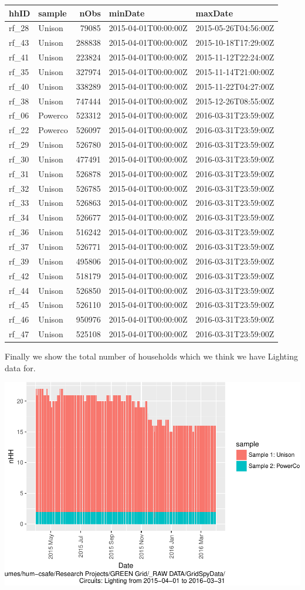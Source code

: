 \documentclass[]{article}
\begin{document}
\begin{longtable}[]{@{}llrll@{}}
\toprule
hhID & sample & nObs & minDate & maxDate\tabularnewline
\midrule
\endhead
rf\_28 & Unison & 79085 & 2015-04-01T00:00:00Z &
2015-05-26T04:56:00Z\tabularnewline
rf\_43 & Unison & 288838 & 2015-04-01T00:00:00Z &
2015-10-18T17:29:00Z\tabularnewline
rf\_41 & Unison & 223824 & 2015-04-01T00:00:00Z &
2015-11-12T22:24:00Z\tabularnewline
rf\_35 & Unison & 327974 & 2015-04-01T00:00:00Z &
2015-11-14T21:00:00Z\tabularnewline
rf\_40 & Unison & 338289 & 2015-04-01T00:00:00Z &
2015-11-22T04:27:00Z\tabularnewline
rf\_38 & Unison & 747444 & 2015-04-01T00:00:00Z &
2015-12-26T08:55:00Z\tabularnewline
rf\_06 & Powerco & 523312 & 2015-04-01T00:00:00Z &
2016-03-31T23:59:00Z\tabularnewline
rf\_22 & Powerco & 526097 & 2015-04-01T00:00:00Z &
2016-03-31T23:59:00Z\tabularnewline
rf\_29 & Unison & 526780 & 2015-04-01T00:00:00Z &
2016-03-31T23:59:00Z\tabularnewline
rf\_30 & Unison & 477491 & 2015-04-01T00:00:00Z &
2016-03-31T23:59:00Z\tabularnewline
rf\_31 & Unison & 526878 & 2015-04-01T00:00:00Z &
2016-03-31T23:59:00Z\tabularnewline
rf\_32 & Unison & 526785 & 2015-04-01T00:00:00Z &
2016-03-31T23:59:00Z\tabularnewline
rf\_33 & Unison & 526863 & 2015-04-01T00:00:00Z &
2016-03-31T23:59:00Z\tabularnewline
rf\_34 & Unison & 526677 & 2015-04-01T00:00:00Z &
2016-03-31T23:59:00Z\tabularnewline
rf\_36 & Unison & 516242 & 2015-04-01T00:00:00Z &
2016-03-31T23:59:00Z\tabularnewline
rf\_37 & Unison & 526771 & 2015-04-01T00:00:00Z &
2016-03-31T23:59:00Z\tabularnewline
rf\_39 & Unison & 495806 & 2015-04-01T00:00:00Z &
2016-03-31T23:59:00Z\tabularnewline
rf\_42 & Unison & 518179 & 2015-04-01T00:00:00Z &
2016-03-31T23:59:00Z\tabularnewline
rf\_44 & Unison & 526850 & 2015-04-01T00:00:00Z &
2016-03-31T23:59:00Z\tabularnewline
rf\_45 & Unison & 526110 & 2015-04-01T00:00:00Z &
2016-03-31T23:59:00Z\tabularnewline
rf\_46 & Unison & 950976 & 2015-04-01T00:00:00Z &
2016-03-31T23:59:00Z\tabularnewline
rf\_47 & Unison & 525108 & 2015-04-01T00:00:00Z &
2016-03-31T23:59:00Z\tabularnewline
\bottomrule
\end{longtable}

Finally we show the total number of households which we think we have
Lighting data for.

\includegraphics{nzGGHouseholdPowerDemandProfile_Lighting_2015-04-01_2016-03-31_files/figure-latex/liveDataHouseholds-1.pdf}
\end{document}
